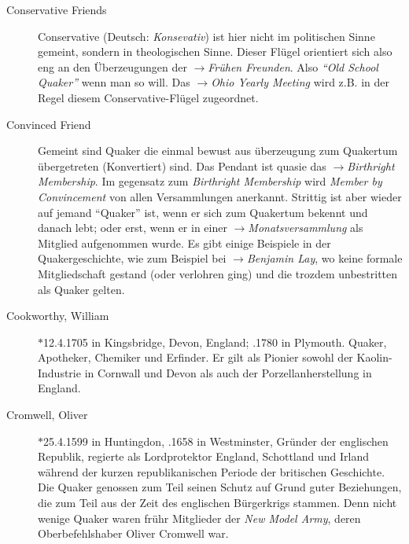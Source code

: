 \begin{description}
 \item[Conservative Friends] Conservative (Deutsch: \textit{Konsevativ}) ist
hier nicht im politischen Sinne gemeint, sondern in theologischen Sinne. Dieser
Flügel orientiert sich also eng an den Überzeugungen der $\to$\textit{Frühen
Freunden}. Also \textit{"`Old School Quaker"'} wenn man so will. Das
$\to$\textit{Ohio Yearly Meeting} wird z.B. in der Regel diesem
Conservative-Flügel zugeordnet.

 \item[Convinced Friend] Gemeint sind Quaker die einmal bewust aus überzeugung
zum Quakertum übergetreten (Konvertiert) sind. Das Pendant ist quasie das
$\to$\textit{Birthright Membership}. Im gegensatz zum \textit{Birthright
Membership} wird \textit{Member by Convincement} von allen Versammlungen
anerkannt. Strittig ist aber wieder auf jemand "`Quaker"' ist, wenn er sich zum
Quakertum bekennt und danach lebt; oder erst, wenn er in einer
$\to$\textit{Monatsversammlung} als Mitglied aufgenommen wurde. Es gibt einige
Beispiele in der Quakergeschichte, wie zum Beispiel bei $\to$\textit{Benjamin
Lay}, wo keine formale Mitgliedschaft gestand (oder verlohren ging) und die
trozdem unbestritten als Quaker gelten.

 \item[Cookworthy, William]$\ast$12.4.1705 in Kingsbridge, Devon, England;
.1780 in Plymouth. Quaker, Apotheker, Chemiker und Erfinder. Er gilt
als Pionier sowohl der Kaolin-Industrie in Cornwall und Devon als auch der
Porzellanherstellung in England.

 \item[Cromwell, Oliver] $\ast$25.4.1599 in Huntingdon, .1658 in
Westminster, Gründer der englischen Republik, regierte als Lordprotektor
England, Schottland und Irland während der kurzen republikanischen Periode der
britischen Geschichte. Die Quaker genossen zum Teil seinen Schutz auf Grund
guter Beziehungen, die zum Teil aus der Zeit des englischen Bürgerkrigs stammen.
Denn nicht wenige Quaker waren frühr Mitglieder der \textit{New Model Army},
deren Oberbefehlshaber Oliver Cromwell war.

 \end{description}

\normalsize